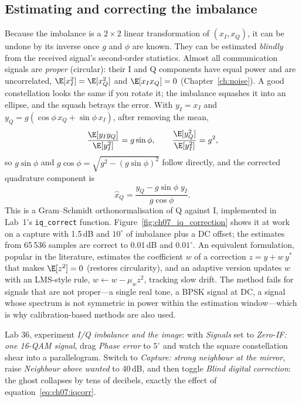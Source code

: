 \subsection{Estimating and correcting the imbalance}

Because the imbalance is a $2\times2$ linear transformation of $(x_I,x_Q)$, it can be undone by its
inverse once $g$ and $\phi$ are known. They can be estimated \emph{blindly} from the received signal's
second-order statistics. Almost all communication signals are \emph{proper} (circular): their I and Q
components have equal power and are uncorrelated, $\E[x_I^2]=\E[x_Q^2]$ and $\E[x_Ix_Q]=0$
(Chapter~\ref{ch:noise}). A good constellation looks the same if you rotate it; the imbalance squashes
it into an ellipse, and the squash betrays the error. With $y_I=x_I$ and
$y_Q=g(\cos\phi\,x_Q+\sin\phi\,x_I)$, after removing the mean,
\begin{equation}
\frac{\E[y_Iy_Q]}{\E[y_I^2]}=g\sin\phi,\qquad \frac{\E[y_Q^2]}{\E[y_I^2]}=g^2,
\end{equation}
so $g\sin\phi$ and $g\cos\phi=\sqrt{g^2-(g\sin\phi)^2}$ follow directly, and the corrected quadrature
component is
\begin{equation}
\hat x_Q=\frac{y_Q-g\sin\phi\;y_I}{g\cos\phi}.
\label{eq:ch07:iqcorr}
\end{equation}
This is a Gram--Schmidt orthonormalisation of Q against I, implemented in Lab~1's \texttt{iq\_correct}
function. Figure~\ref{fig:ch07_iq_correction} shows it at work on a capture with 1.5\,dB and $10^\circ$ of
imbalance plus a DC offset; the estimates from 65\,536 samples are correct to 0.01\,dB and $0.01^\circ$. An
equivalent formulation, popular in the literature, estimates the coefficient $w$ of a correction
$z=y+w\,y^*$ that makes $\E[z^2]=0$ (restores circularity), and an adaptive version updates $w$ with an
LMS-style rule, $w\leftarrow w-\mu_wz^2$, tracking slow drift. The method fails for signals that are not
proper---a single real tone, a BPSK signal at DC, a signal whose spectrum is not symmetric in power
within the estimation window---which is why calibration-based methods are also used.

\begin{tryit}
Lab 36, experiment \emph{I/Q imbalance and the image}: with \emph{Signals} set to \emph{Zero-IF: one
16-QAM signal}, drag \emph{Phase error} to $5^\circ$ and watch the square constellation shear into a
parallelogram. Switch to \emph{Capture: strong neighbour at the mirror}, raise \emph{Neighbour above
wanted} to 40\,dB, and then toggle \emph{Blind digital correction}: the ghost collapses by tens of
decibels, exactly the effect of equation~\eqref{eq:ch07:iqcorr}.
\end{tryit}

